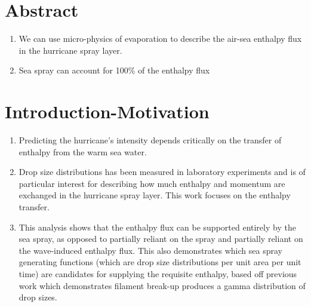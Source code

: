 \documentclass[10pt,a4paper]{article}
\begin{document}
 \renewcommand{\theenumi}{\Roman{enumi}}
 \renewcommand{\theenumii}{\arabic{enumii}}
 \renewcommand{\theenumiii}{\alpha{enumiii}}
\section{Abstract}
\begin{enumerate}
\item We can use micro-physics of evaporation to describe the air-sea enthalpy flux in the hurricane spray layer.\\
\item Sea spray can account for 100\% of the enthalpy flux 
\end{enumerate}

\section{Introduction-Motivation}
\begin{enumerate}
\item Predicting the hurricane's intensity depends critically on the transfer of enthalpy from the warm sea water.
\item Drop size distributions has been measured in laboratory experiments and is of particular interest for describing how much enthalpy and momentum are exchanged in the hurricane spray layer. This work focuses on the enthalpy transfer. 
\item This analysis shows that the enthalpy flux can be supported entirely by the sea spray, as opposed to partially reliant on the spray and partially reliant on the wave-induced enthalpy flux. This also demonstrates which sea spray generating functions (which are drop size distributions per unit area per unit time) are candidates for supplying the requisite enthalpy, based off previous work which demonstrates filament break-up produces a gamma distribution of drop sizes. 
\end{enumerate}
\end{document}
